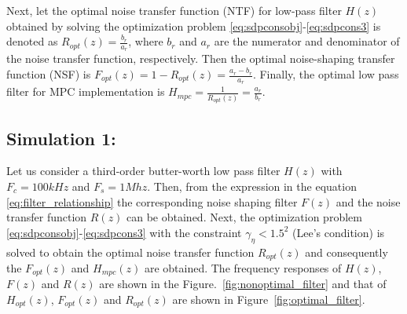 \documentclass[a4paper]{article}
\begin{document}
Next, let the optimal noise transfer function (NTF) for low-pass filter $H(z)$ obtained by solving the optimization problem \eqref{eq:sdpconsobj}-\eqref{eq:sdpcons3} is denoted as $\displaystyle{R_{opt}(z) = \frac{b_{r}}{a_r}}$, where $b_{r}$ and $a_{r}$ are the numerator and denominator of the noise transfer function, respectively.   Then the optimal noise-shaping transfer function (NSF) is $\displaystyle{F_{opt}(z) = 1- R_{opt}(z)= \frac{a_{r}-b_{r}}{a_{r}}}$. Finally, the optimal low pass filter for MPC implementation is $H_{mpc} = \frac{1}{R_{opt}(z)} = \frac{a_{r}}{b_{r}}$.



\subsection{Simulation 1:}
Let us consider a third-order butter-worth low pass filter $H(z)$ with $F_c = 100 \mathit{kHz}$  and $F_s = 1 \mathit{Mhz}$. Then, from the expression in the equation \ref{eq:filter_relationship} the corresponding noise shaping filter $F(z)$ and the noise transfer function $R(z)$ can be obtained. 
Next, the optimization problem \eqref{eq:sdpconsobj}-\eqref{eq:sdpcons3} with the constraint $\gamma_{\eta} < 1.5^{2}$ (Lee's condition) is solved to obtain the optimal noise transfer function $R_{opt}(z)$ and consequently the $F_{opt}(z)$ and $H_{mpc}(z)$ are obtained. The frequency responses of $H(z)$, $F(z)$ and $R(z)$ are shown in the Figure.~\ref{fig:nonoptimal_filter} and that of $H_{opt}(z)$, $F_{opt}(z)$ and $R_{opt}(z)$ are shown in Figure~\ref{fig:optimal_filter}.
\end{document}
